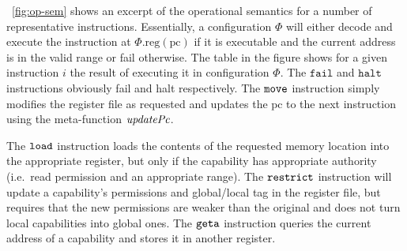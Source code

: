 \documentclass[compsoc,conference,letterpaper,fleqn]{IEEEtran}
\newcommand{\update}[2]{[#1 \mapsto #2]}
\newcommand{\sem}[1]{\left\llbracket #1 \right\rrbracket}
\newcommand{\var}[1]{\mathit{#1}}
\newcommand{\lv}{\var{r}}
\newcommand{\gl}{\var{g}}
\newcommand{\pcreg}{\mathrm{pc}}
\newcommand{\addr}{\var{a}}
\newcommand{\start}{\var{b}}
\newcommand{\addrend}{\var{e}}
\newcommand{\perm}{\var{perm}}
\newcommand{\permp}{\var{permPair}}
\newcommand{\stdcap}[1][(\perm,\gl)]{\left(#1,\start,\addrend,\addr \right)}
\newcommand{\plainproj}[1]{\mathrm{#1}}
\newcommand{\memreg}[1][\Phi]{#1.\plainproj{reg}}
\newcommand{\updateHeap}[3][\Phi]{#1\update{\plainproj{mem}.#2}{#3}}
\newcommand{\updateReg}[3][\Phi]{#1\update{\plainproj{reg}.#2}{#3}}
\newcommand{\plainfun}[2]{
  \ifthenelse{\equal{#2}{}}
  {\mathit{#1}}
  {\mathit{#1}(#2)}
}
\newcommand{\decodePermPair}{\plainfun{decodePermPair}}
\newcommand{\updatePcPerm}[1]{\plainfun{updatePcPerm}{#1}}
\newcommand{\stdUpdatePc}[1]{\plainfun{updatePc}{#1}}
\newcommand{\refreg}[1]{#1}
\newcommand{\refheap}[1]{#1}
\newcommand{\zinstr}[1]{\mathtt{#1}}
\newcommand{\fail}{\zinstr{fail}}
\newcommand{\halt}{\zinstr{halt}}
\newcommand{\oneinstr}[2]{
  \ifthenelse{\equal{#2}{}}
  {\zinstr{#1}}
  {\zinstr{#1} \; #2}
}
\newcommand{\jmp}[1]{\oneinstr{jmp}{#1}}
\newcommand{\twoinstr}[3]{
  \ifthenelse{\equal{#2#3}{}}
  {\zinstr{#1}}
  {\zinstr{#1} \; #2 \; #3}
}
\newcommand{\restricttwo}[2]{\twoinstr{restrict}{#1}{#2}}
\newcommand{\geta}[2]{\twoinstr{geta}{#1}{#2}}
\newcommand{\move}[2]{\twoinstr{move}{#1}{#2}}
\newcommand{\store}[2]{\twoinstr{store}{#1}{#2}}
\newcommand{\load}[2]{\twoinstr{load}{#1}{#2}}
\newcommand{\plainperm}[1]{\mathrm{#1}}
\newcommand{\readwrite}{\plainperm{rw}}
\newcommand{\rwx}{\plainperm{rwx}}
\newcommand{\readwritel}{\plainperm{rwl}}
\newcommand{\rwlx}{\plainperm{rwlx}}
\newcommand{\local}{\plainperm{local}}
\begin{document}

\figurename~\ref{fig:op-sem} shows an excerpt of the operational semantics for a
number of representative instructions. Essentially, a configuration $\Phi$ will
either decode and execute the instruction at $\memreg(\pcreg)$ if it is
executable and the current address is in the valid range or fail otherwise. The
table in the figure shows for a given instruction $i$ the result of executing it
in configuration $\Phi$. The $\fail$ and $\halt$ instructions obviously fail and
halt respectively. The $\move{}{}$ instruction simply modifies the register file
as requested and updates the $\pcreg$ to the next instruction using the
meta-function $\stdUpdatePc{}$.

The $\load{}{}$ instruction loads the contents of the requested memory location
into the appropriate register, but only if the capability has appropriate
authority (i.e.\ read permission and an appropriate range). The $\restricttwo{}{}$
instruction will update a capability's permissions and global/local tag in
the register file, but requires that the new permissions are weaker than the
original and does not turn local capabilities into global ones. The $\geta{}{}$
instruction queries the current address of a capability and stores it in another
register.
\end{document}

